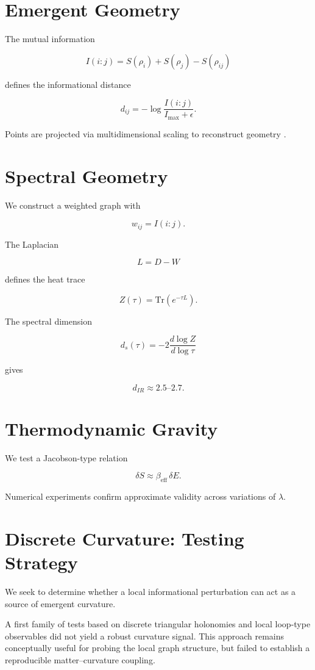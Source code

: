 \documentclass[11pt]{article}
\begin{document}
\section{Emergent Geometry}

The mutual information

\[
I(i:j)=S(\rho_i)+S(\rho_j)-S(\rho_{ij})
\]

defines the informational distance

\[
d_{ij}=-\log\frac{I(i:j)}{I_{\max}+\epsilon}.
\]

Points are projected via multidimensional scaling to reconstruct
geometry \cite{vanraamsdonk}.

\section{Spectral Geometry}

We construct a weighted graph with

\[
w_{ij}=I(i:j).
\]

The Laplacian

\[
L=D-W
\]

defines the heat trace

\[
Z(\tau)=\mathrm{Tr}(e^{-\tau L}).
\]

The spectral dimension

\[
d_s(\tau)=-2\frac{d\log Z}{d\log\tau}
\]

gives

\[
d_{IR}\approx2.5\text{--}2.7.
\]

\section{Thermodynamic Gravity}

We test a Jacobson-type relation \cite{jacobson}

\[
\delta S\approx \beta_{\mathrm{eff}}\,\delta E.
\]

Numerical experiments confirm approximate validity across variations
of $\lambda$.

\section{Discrete Curvature: Testing Strategy}

We seek to determine whether a local informational perturbation can
act as a source of emergent curvature.

A first family of tests based on discrete triangular holonomies and
local loop-type observables did not yield a robust curvature signal.
This approach remains conceptually useful for probing the local graph
structure, but failed to establish a reproducible matter--curvature
coupling.
\end{document}

